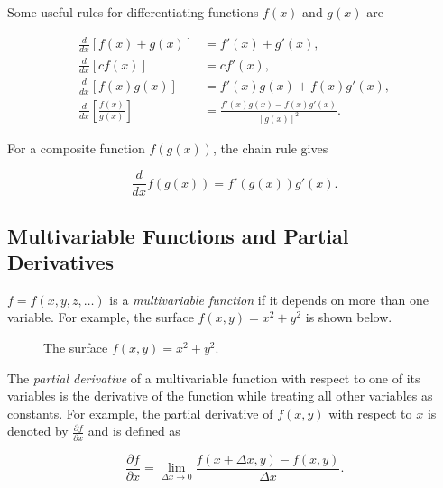 \documentclass[../main.tex]{subfiles}
\begin{document}
Some useful rules for differentiating functions \(f(x)\) and \(g(x)\) are

\begin{align*}
\frac{d}{dx}[f(x)+g(x)]
&= f'(x)+g'(x), \\
\frac{d}{dx}[c f(x)]
&= c f'(x), \\
\frac{d}{dx}[f(x)g(x)]
&= f'(x)g(x)+f(x)g'(x), \\
\frac{d}{dx}\left[\frac{f(x)}{g(x)}\right]
&=
\frac{f'(x)g(x)-f(x)g'(x)}{[g(x)]^2}.
\end{align*}

For a composite function \(f(g(x))\), the chain rule gives

\[
\frac{d}{dx}f(g(x))
=
f'(g(x))g'(x).
\]

\subsection{Multivariable Functions and Partial Derivatives}
$f=f(x,y,z,\hdots)$ is a \emph{multivariable function} if it depends on more than one variable. For example, the surface $f(x,y)=x^2+y^2$ is shown below.

\begin{figure}[h]
\centering
{}
\caption{The surface $f(x,y)=x^2+y^2$.}
\end{figure}

The \emph{partial derivative} of a multivariable function with respect to one of its variables is the derivative of the function while treating all other variables as constants. For example, the partial derivative of \(f(x,y)\) with respect to \(x\) is denoted by \(\frac{\partial f}{\partial x}\) and is defined as

\[
\frac{\partial f}{\partial x}
=
\lim_{\Delta x \to 0}
\frac{f(x+\Delta x,y)-f(x,y)}{\Delta x}.
\]
\end{document}
